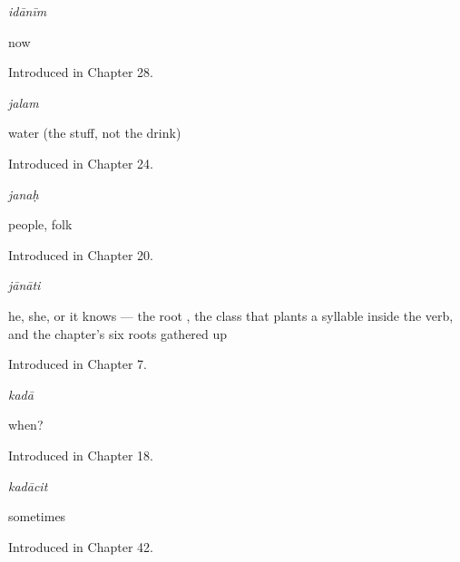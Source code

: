 \noindent\begin{minipage}[t]{\linewidth}
\raggedright
\textbf{}\enspace\emph{idānīm}\par
\small now\par
\footnotesize Introduced in Chapter 28.
\end{minipage}\par\medskip

\noindent\begin{minipage}[t]{\linewidth}
\raggedright
\textbf{}\enspace\emph{jalam}\par
\small water (the stuff, not the drink)\par
\footnotesize Introduced in Chapter 24.
\end{minipage}\par\medskip

\noindent\begin{minipage}[t]{\linewidth}
\raggedright
\textbf{}\enspace\emph{janaḥ}\par
\small people, folk\par
\footnotesize Introduced in Chapter 20.
\end{minipage}\par\medskip

\noindent\begin{minipage}[t]{\linewidth}
\raggedright
\textbf{}\enspace\emph{jānāti}\par
\small he, she, or it knows — the root , the class that plants a syllable inside the verb, and the chapter's six roots gathered up\par
\footnotesize Introduced in Chapter 7.
\end{minipage}\par\medskip

\noindent\begin{minipage}[t]{\linewidth}
\raggedright
\textbf{}\enspace\emph{kadā}\par
\small when?\par
\footnotesize Introduced in Chapter 18.
\end{minipage}\par\medskip

\noindent\begin{minipage}[t]{\linewidth}
\raggedright
\textbf{}\enspace\emph{kadācit}\par
\small sometimes\par
\footnotesize Introduced in Chapter 42.
\end{minipage}\par\medskip

